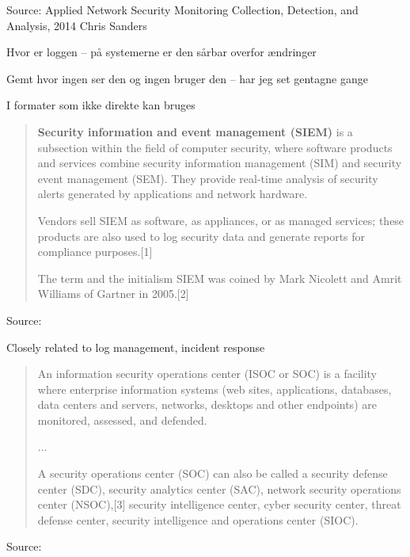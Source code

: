 \documentclass[Screen16to9,17pt]{foils}
\begin{document}
Source: Applied Network Security Monitoring Collection, Detection, and Analysis, 2014 Chris Sanders

\begin{list2}
\item Hvor er loggen -- på systemerne er den sårbar overfor ændringer
\item Gemt hvor ingen ser den og ingen bruger den -- har jeg set gentagne gange
\item I formater som ikke direkte kan bruges
\end{list2}






\begin{quote}
{\bf Security information and event management (SIEM)} is a subsection within the field of computer security, where software products and services combine security information management (SIM) and security event management (SEM). They provide real-time analysis of security alerts generated by applications and network hardware.

  Vendors sell SIEM as software, as appliances, or as managed services; these products are also used to log security data and generate reports for compliance purposes.[1]

  The term and the initialism SIEM was coined by Mark Nicolett and Amrit Williams of Gartner in 2005.[2]
\end{quote}
Source: 

\begin{list2}
\item Closely related to log management, incident response
\end{list2}




\begin{quote}
An information security operations center (ISOC or SOC) is a facility where enterprise information systems (web sites, applications, databases, data centers and servers, networks, desktops and other endpoints) are monitored, assessed, and defended.

...

A security operations center (SOC) can also be called a security defense center (SDC), security analytics center (SAC), network security operations center (NSOC),[3] security intelligence center, cyber security center, threat defense center, security intelligence and operations center (SIOC).
\end{quote}
Source: 
\end{document}
